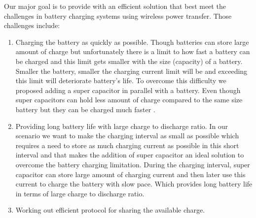 Our major goal is to provide with an efficient solution that best meet the challenges in battery charging systems using wireless power transfer.
Those challenges include:
\begin{enumerate}
\item Charging the battery as quickly as possible.
Though batteries can store large amount of charge but unfortunately there is a limit to how fast a battery can be charged and this limit gets smaller with the size (capacity) of a battery. Smaller the battery, smaller the charging current limit will be and exceeding this limit will deteriorate battery's life. To overcome this difficulty we proposed adding a super capacitor in parallel with a battery. Even though super capacitors can hold less amount of charge compared to the same size battery but they can be charged much faster \cite{IAmp}.
\item Providing long battery life with large charge to discharge ratio.
In our scenario we want to make the charging interval as small as possible which requires a need to store as much charging current as possible in this short interval and that makes the addition of super capacitor an ideal solution to overcome the battery charging limitation. During the charging interval, super capacitor can store large amount of charging current and then later use this current to charge the battery with slow pace. Which provides long battery life in terms of large charge to discharge ratio.

\item Working out efficient protocol for sharing the available charge.

\end{enumerate}

